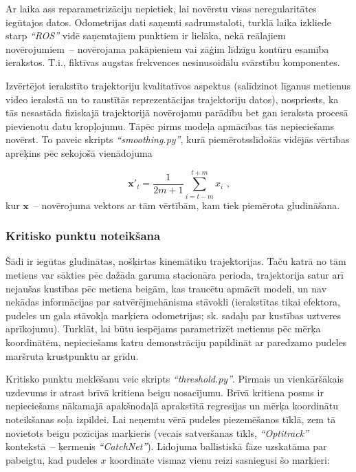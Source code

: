 \documentclass[12pt, a4paper]{article}
\numberwithin{equation}{section} %
\begin{document}
Ar laika ass reparametrizāciju nepietiek, lai novērstu visas neregularitātes iegūtajos datos. Odometrijas dati saņemti sadrumstaloti, turklā laika izkliede starp \textit{``ROS''} vidē saņemtajiem punktiem ir lielāka, nekā reālajiem novērojumiem~-- novērojama pakāpieniem vai zāģim līdzīgu kontūru esamība ierakstos. T.i., fiktīvas augstas frekvences nesinusoidālu svārstību komponentes. 

Izvērtējot ierakstīto trajektoriju kvalitatīvos aspektus (salīdzinot līganus metienus video ierakstā un to raustītās reprezentācijas trajektoriju datos), nospriests, ka tās nesastāda fiziskajā trajektorijā novērojamu parādību bet gan ieraksta procesā pievienotu datu kropļojumu. Tāpēc pirms modeļa apmācības tās nepieciešams novērst. To paveic skripts \textit{``smoothing.py''}, kurā piemērotsslīdošās vidējās vērtības aprēķins pēc sekojošā vienādojuma

\begin{equation}
     \boldsymbol{x}'_{t} = \frac{1}{2m+1} \sum_{i=t-m}^{t+m}  x_i
\text{ ,}
\end{equation}
kur $ \boldsymbol{x}$~-- novērojuma vektors ar tām vērtībām, kam tiek piemērota gludināšana.

\subsubsection{Kritisko punktu noteikšana}

Šādi ir iegūtas gludinātas, nošķirtas kinemātiku trajektorijas. Taču katrā no tām metiens var sākties pēc dažāda garuma stacionāra perioda, trajektorija satur arī nejaušas kustības pēc metiena beigām, kas traucētu apmācīt modeli, un nav nekādas informācijas par satvērējmehānisma stāvokli (ierakstītas tikai efektora, pudeles un gala stāvokļa marķiera odometrijas; sk. sadaļu par kustības uztveres aprīkojumu). Turklāt, lai būtu iespējams parametrizēt metienus pēc mērķa koordinātēm, nepieciešams katru demonstrāciju papildināt ar paredzamo pudeles maršruta krustpunktu ar grīdu. 

Kritisko punktu meklēšanu veic skripts \textit{``threshold.py''}. Pirmais un vienkāršākais uzdevums ir atrast brīvā kritiena beigu nosacījumu. Brīvā kritiena posms ir nepieciešams nākamajā apakšnodaļā aprakstītā regresijas un mērķa koordinātu noteikšanas soļa izpildei. Lai neņemtu vērā pudeles piezemēšanos tīklā, zem tā novietots beigu pozīcijas marķieris (vecais satveršanas tīkls, \textit{``Optitrack''} kontekstā~-- ķermenis \textit{``CatchNet''}). Lidojuma ballistiskā fāze uzskatāma par pabeigtu, kad pudeles $x$ koordināte vismaz vienu reizi sasniegusi šo marķieri:
\end{document}
